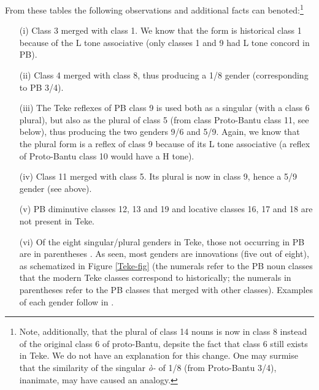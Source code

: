 \documentclass[output=paper,,modfonts,nonflat]{langsci/langscibook}
\begin{document}
From these tables the following observations and additional facts can be\linebreak noted:\footnote{Note, additionally, that the plural of class 14 nouns is now in class 8 instead of the original class 6 of proto-Bantu, depsite the fact that class 6 still exists in Teke. We do not have an explanation for this change. One may surmise that the similarity of the singular \emph{ò-} of 1/8 (from Proto-Bantu 3/4), inanimate, may have caused an analogy.}
\begin{enumerate}
\item[(i)] Class 3 merged with class 1. We know that the form is historical class 1 because of the L tone associative (only classes 1 and 9 had L tone concord in PB).
\item[(ii)] Class 4 merged with class 8, thus producing a 1/8 gender (corresponding to PB 3/4).
\item[(iii)]  The Teke reflexes of PB class 9 is used both as a singular (with a class 6 plural), but also as the plural of class 5 (from class Proto-Bantu class 11, see below), thus producing the two genders 9/6 and 5/9. Again, we know that the plural form is a reflex of class 9 because of its L tone associative (a reflex of Proto-Bantu class 10 would have a H tone).
\item[(iv)]  Class 11 merged with class 5. Its plural is now in class 9, hence a 5/9 gender (see above).
\item[(v)]  PB diminutive classes 12, 13 and 19 and locative classes 16, 17 and 18 are not present in Teke.
\item[(vi)]  Of the eight singular/plural genders in Teke, those not occurring in PB are in parentheses \citep[255--261]{Maho1999}. As seen, most genders are innovations (five out of eight), as schematized in Figure \ref{Teke-fig} (the numerals refer to the PB noun classes that the modern Teke classes correspond to historically; the numerals in parentheses refer to the PB classes that merged with other classes). Examples of each gender follow in . 
\end{enumerate}
\end{document}
